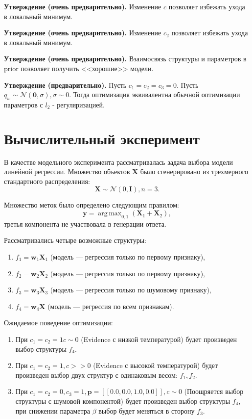 \documentclass[12pt]{article}
\DeclareMathOperator*{\argmax}{arg\,max}
\begin{document}
\textbf{Утверждение (очень предварительно).} Изменение $c$ позволяет избежать ухода в локальный минимум. 

\textbf{Утверждение (очень предварительно).} Изменение $c_2$ позволяет избежать ухода в локальный минимум.

\textbf{Утверждение (очень предварительно).} Взаимосвязь структуры и параметров в prior позволяет получить <<хорошие>> модели.

\textbf{Утверждение (предварительно).} Пусть $c_1 = c_2 = c_3 = 0$. Пусть $q_w \sim \mathcal{N}(\mathbf{0}, \sigma), \sigma \sim 0$. 
Тогда оптимизация эквивалентна обычной оптимизации параметров с $l_2$ - регуляризацией.


\section{Вычислительный эксперимент}
В качестве модельного эксперимента рассматривалась задача выбора модели линейной регрессии.
Множество объектов $\mathbf{X}$ было сгенерировано из трехмерного стандартного распределения: 
\[
    \mathbf{X} \sim \mathcal{N}(0, \mathbf{I}), n = 3.
\]

Множество меток было определено следующим правилом:
\[
    \mathbf{y}= \argmax_{0,1} (\mathbf{X}_1 + \mathbf{X}_2),
\]
третья компонента не участвовала в генерации ответа.

Рассматривались четыре возможные структуры:
\begin{enumerate}
\item $f_1 = \mathbf{w}_1 \mathbf{X}_1$ (модель --- регрессия только по первому признаку), 

\item $f_2 = \mathbf{w}_2 \mathbf{X}_2$ (модель --- регрессия только по первому признаку), 

\item $f_3 = \mathbf{w}_3 \mathbf{X}_3$ (модель --- регрессия только по шумовому признаку), 

\item $f_4 = \mathbf{w}_4 \mathbf{X}$ (модель --- регрессия по всем признакам). 
\end{enumerate}

Ожидаемое поведение оптимизации:
\begin{enumerate}
\item При $c_1 = c_2 = 1 c \sim 0$ (Evidence с низкой температурой) будет произведен выбор структуры $f_4$.

\item При $c_1 = c_2 = 1, c >>0$ (Evidence с высокой температурой) будет произведен выбор двух структур с одинаковым весом: $f_1, f_2$.

\item При $c_1 = c_2 = 0, c_3 = 1, \mathbf{p}= [[0.0, 0.0, 1.0, 0.0]], c \sim 0$ (Поощряется выбор структуры с шумовой компонентой) будет произведен выбор структуры $f_4$, при снижении параметра $\beta$ выбор будет меняться в сторону $f_3$.
\end{enumerate}
\end{document}
